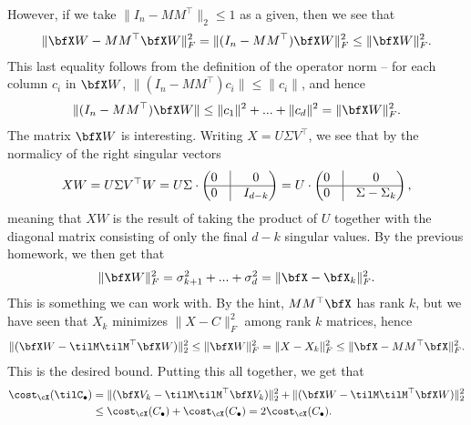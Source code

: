 \begin{homework}[e]
\begin{prf}
    However, if we take $\|I_n - MM^\top\|_2 \leq 1$ as a given, then we see that
    \begin{align*}
      \|\bfX W - MM^\top\bfX W\|^2_F = \|(I_n - MM^\top)\bfX W\|^2_F \leq \|\bfX W\|^2_F.
    \end{align*}
    This last equality follows from the definition of the operator norm -- for each column $c_i$ in $\bfX W$, $\|(I_n - MM^\top)c_i\| \leq \|c_i\|$, and hence
    \begin{align*}
      \|(I_n - MM^\top)\bfX W\| \leq \|c_1\|^2 + ... + \|c_d\|^2 = \|\bfX W\|^2_F.
    \end{align*}
    The matrix $\bfX W$ is interesting. Writing $X = U\Sigma V^\top$, we see that by the normalicy of the right singular vectors
    \begin{align*}
      X W = U\Sigma V^\top W = U \Sigma \cdot 
      \begin{pmatrix}
        0 & \vline & 0 \\
        \hline
        0 & \vline & I_{d - k}
      \end{pmatrix} = U\cdot 
      \begin{pmatrix}
        0 & \vline & 0 \\
        \hline
        0 & \vline & \Sigma - \Sigma_k
      \end{pmatrix},
    \end{align*}
    meaning that $XW$ is the result of taking the product of $U$ together with the diagonal matrix consisting of only the final $d - k$ singular values. By the previous homework, we then get that
    \begin{align*}
      \|\bfX W\|^2_F = \sigma_{k+1}^2 + ... + \sigma_d^2 = \|\bfX - \bfX_k\|^2_F.
    \end{align*}
    This is something we can work with. By the hint, $MM^\top\bfX$ has rank $k$, but we have seen that $X_k$ minimizes $\|X - C\|^2_F$ among rank $k$ matrices, hence
    \begin{align*}
      \|(\bfX W - \tilM\tilM^\top \bfX W)\|^2_2 \leq \|\bfX W\|^2_F = \|X - X_k\|^2_F \leq \|\bfX - MM^\top \bfX\|^2_F.
    \end{align*}
    This is the desired bound. Putting this all together, we get that
    \begin{align*}
      \cost_\cX(\tilC_\bullet)
          &= \|(\bfX V_k - \tilM\tilM^\top\bfX V_k)\|^2_2 + \|(\bfX W - \tilM\tilM^\top \bfX W)\|^2_2 \\
          &\leq \cost_\cX(C_\bullet) + \cost_\cX(C_\bullet) = 2\cost_\cX(C_\bullet).

\end{align*}
\end{prf}
\end{homework}
